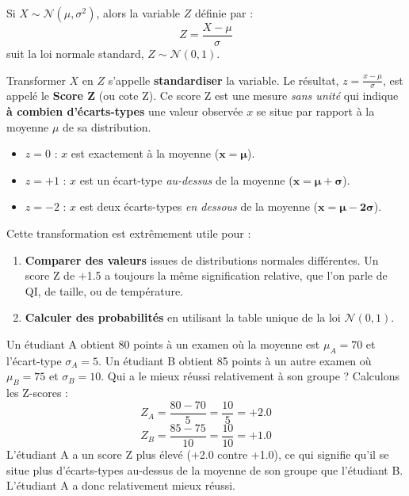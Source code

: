 \begin{theorembox}
Si $X \sim \mathcal{N}(\mu, \sigma^2)$, alors la variable $Z$ définie par :
$$ Z = \frac{X - \mu}{\sigma} $$
suit la loi normale standard, $Z \sim \mathcal{N}(0, 1)$.
\end{theorembox}

\begin{intuitionbox}
Transformer $X$ en $Z$ s'appelle \textbf{standardiser} la variable. Le résultat, $z = \frac{x-\mu}{\sigma}$, est appelé le \textbf{Score Z} (ou cote Z). Ce score Z est une mesure \textit{sans unité} qui indique \textbf{à combien d'écarts-types} une valeur observée $x$ se situe par rapport à la moyenne $\mu$ de sa distribution.
\begin{itemize}
    \item $z = 0$ : $x$ est exactement à la moyenne ($\mathbf{x = \mu}$).
    \item $z = +1$ : $x$ est un écart-type \textit{au-dessus} de la moyenne ($\mathbf{x = \mu + \sigma}$).
    \item $z = -2$ : $x$ est deux écarts-types \textit{en dessous} de la moyenne ($\mathbf{x = \mu - 2\sigma}$).
\end{itemize}
Cette transformation est extrêmement utile pour :
\begin{enumerate}
    \item \textbf{Comparer des valeurs} issues de distributions normales différentes. Un score Z de +1.5 a toujours la même signification relative, que l'on parle de QI, de taille, ou de température.
    \item \textbf{Calculer des probabilités} en utilisant la table unique de la loi $\mathcal{N}(0, 1)$.
\end{enumerate}
\end{intuitionbox}

\begin{examplebox}
Un étudiant A obtient 80 points à un examen où la moyenne est $\mu_A=70$ et l'écart-type $\sigma_A=5$. Un étudiant B obtient 85 points à un autre examen où $\mu_B=75$ et $\sigma_B=10$. Qui a le mieux réussi relativement à son groupe ?
\newline
Calculons les Z-scores :
$$ Z_A = \frac{80 - 70}{5} = \frac{10}{5} = +2.0 $$
$$ Z_B = \frac{85 - 75}{10} = \frac{10}{10} = +1.0 $$
L'étudiant A a un score Z plus élevé (+2.0 contre +1.0), ce qui signifie qu'il se situe plus d'écarts-types au-dessus de la moyenne de son groupe que l'étudiant B. L'étudiant A a donc relativement mieux réussi.
\end{examplebox}

